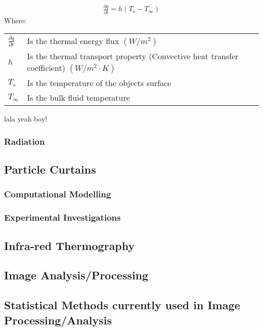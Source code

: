 \documentclass[12pt]{article}
\begin{document}
\begin{align} \label{NetonsCooling}
	\frac{\partial q}{\partial t} = h(T_s - T_\infty) 
\end{align}
Where: \\ 
\begin{tabular}{l | l}
	$\frac{\partial q}{\partial t}$ & Is the thermal energy flux $(W/m^2)$ \\ 
	$h$ & Is the thermal transport property (Convective heat transfer coefficient) $(W/m^2 \cdot K)$ \\ 
	$T_s$ & Is the temperature of the objects surface \\ 
	$T_\infty$ & Is the bulk fluid temperature \\   
\end{tabular}

lala yeah boy!

\subsubsection{Radiation}

\subsection{Particle Curtains}
\subsubsection{Computational Modelling} 

\subsubsection{Experimental Investigations}

\subsection{Infra-red Thermography}

\subsection{Image Analysis/Processing}

\subsection{Statistical Methods currently used in Image Processing/Analysis} 
\end{document}

